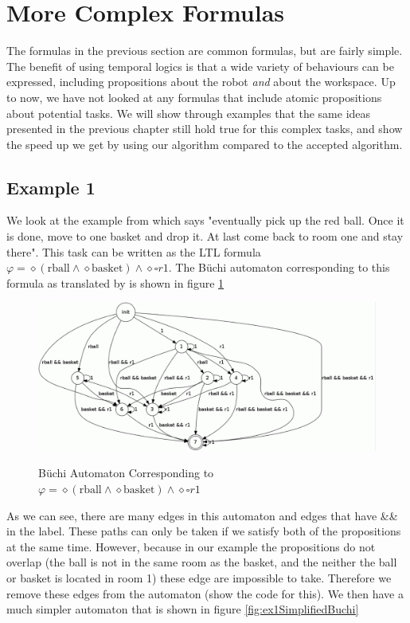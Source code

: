 \section{More Complex Formulas}
The formulas in the previous section are common formulas, but are fairly simple. The benefit of using temporal logics is that a wide variety of behaviours can be expressed, including propositions about the robot \textit{and} about the workspace. Up to now, we have not looked at any formulas that include atomic propositions about potential tasks. We will show through examples that the same ideas presented in the previous chapter still hold true for this complex tasks, and show the speed up we get by using our algorithm compared to the accepted algorithm. 

\subsection{Example 1}
We look at the example from \cite{guo15} which says "eventually pick up the red ball. Once it is done, move to one basket and drop it. At last come back to room one and stay there". This task can be written as the LTL formula $\varphi = \diamond (\text{rball} \wedge \diamond \text{basket}) \wedge \diamond \square r1$. The B\"uchi automaton corresponding to this formula as translated by \cite{gastin01} is shown in figure \ref{fig:buchiEx1}

\begin{figure}[!htb]
\centering
\includegraphics[scale=0.4]{buchiEx1}
\label{fig:buchiEx1}
\caption{B\"uchi Automaton Corresponding to $\varphi = \diamond (\text{rball} \wedge \diamond \text{basket}) \wedge \diamond \square r1$}
\end{figure} 


As we can see, there are many edges in this automaton and edges that have \&\& in the label. These paths can only be taken if we satisfy both of the propositions at the same time. However, because in our example the propositions do not overlap (the ball is not in the same room as the basket, and the neither the ball or basket is located in room 1) these edge are impossible to take. Therefore we remove these edges from the automaton (show the code for this). We then have a much simpler automaton that is shown in figure \ref{fig:ex1SimplifiedBuchi}

